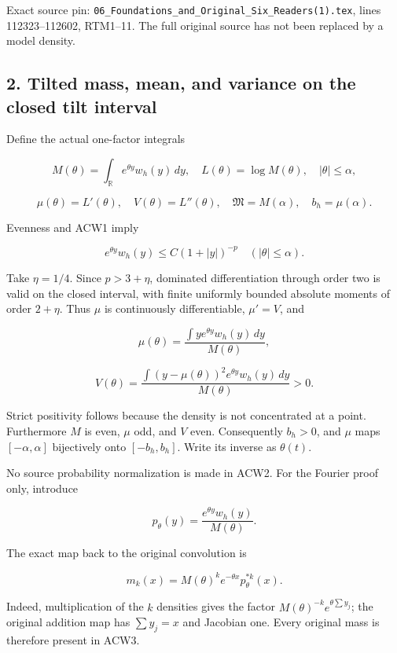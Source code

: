Exact source pin: \texttt{06\_Foundations\_and\_Original\_Six\_Readers(1).tex}, lines 112323--112602, RTM1--11. The full original source has not been replaced by a model density.

\subsection{2. Tilted mass, mean, and variance on the closed tilt interval}\label{acw:tilted-mass-mean-and-variance-on-the-closed-tilt-interval}

Define the actual one-factor integrals

\[
M(\theta)=\int_{\mathbb R}e^{\theta y}w_h(y)\,dy,
\quad L(\theta)=\log M(\theta),\quad |\theta|\le\alpha,
\]

\[
\mu(\theta)=L'(\theta),\quad V(\theta)=L''(\theta),\quad
\mathfrak M=M(\alpha),\quad b_h=\mu(\alpha).
\tag{ACW2}
\]

Evenness and ACW1 imply

\[
e^{\theta y}w_h(y)\le C(1+|y|)^{-p}
\quad(|\theta|\le\alpha).
\]

Take \(\eta=1/4\). Since \(p>3+\eta\), dominated differentiation through order two is valid on the closed interval, with finite uniformly bounded absolute moments of order \(2+\eta\). Thus \(\mu\) is continuously differentiable, \(\mu'=V\), and

\[
\mu(\theta)=\frac{\int y e^{\theta y}w_h(y)\,dy}{M(\theta)},
\]

\[
V(\theta)=\frac{\int (y-\mu(\theta))^2e^{\theta y}w_h(y)\,dy}{M(\theta)}>0.
\]

Strict positivity follows because the density is not concentrated at a point. Furthermore \(M\) is even, \(\mu\) odd, and \(V\) even. Consequently \(b_h>0\), and \(\mu\) maps \([-\alpha,\alpha]\) bijectively onto \([-b_h,b_h]\). Write its inverse as \(\theta(t)\).

No source probability normalization is made in ACW2. For the Fourier proof only, introduce

\[
p_\theta(y)=\frac{e^{\theta y}w_h(y)}{M(\theta)}.
\]

The exact map back to the original convolution is

\[
\boxed{m_k(x)=M(\theta)^k e^{-\theta x}p_\theta^{*k}(x).}
\tag{ACW3}
\]

Indeed, multiplication of the \(k\) densities gives the factor
\(M(\theta)^{-k}e^{\theta\sum y_j}\); the original addition map has \(\sum y_j=x\) and Jacobian one. Every original mass is therefore present in ACW3.

